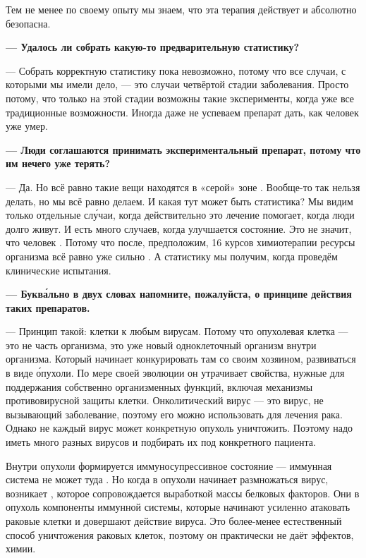 Тем не менее по своему опыту мы знаем, что эта терапия действует и абсолютно безопасна.

{\bf --- Удалось ли собрать какую-то предварительную статистику?}

--- Собрать корректную статистику пока невозможно, потому что все случаи, с которыми мы имели дело, --- это случаи четвёртой стадии заболевания. Просто потому, что только на этой стадии возможны такие эксперименты, когда уже  все традиционные возможности. Иногда даже не успеваем препарат дать, как человек уже умер.

{\bf --- Люди соглашаются принимать экспериментальный препарат, потому что им нечего уже терять?}

--- Да. Но всё равно такие вещи находятся в «серой» зоне . Вообще-то так нельзя делать, но мы всё равно делаем. И какая тут может быть статистика? Мы видим только отдельные сл\'{у}чаи, когда действительно это лечение помогает, когда люди долго живут. И есть много случаев, когда улучшается состояние. Это не значит, что человек . Потому что после, предположим, 16 курсов химиотерапии ресурсы организма всё равно уже сильно . А статистику мы получим, когда проведём клинические испытания.

{\bf --- Букв\'{а}льно в двух словах напомните, пожалуйста, о принципе действия таких препаратов.}

--- Принцип такой:  клетки  к любым вирусам. Потому что опухолевая клетка --- это не часть организма, это уже новый одноклеточный организм внутри организма. Который начинает конкурировать там со своим хозяином, развиваться в виде \'{о}пухоли. По мере своей эволюции он утрачивает свойства, нужные для поддержания собственно организменных функций, включая механизмы противовирусной защиты клетки. Онколитический вирус --- это вирус, не вызывающий заболевание, поэтому его можно использовать для лечения рака. Однако не каждый вирус может конкретную опухоль уничтожить. Поэтому надо иметь много разных вирусов и подбирать их под конкретного пациента.

Внутри опухоли формируется иммуносупрессивное состояние --- иммунная система не может туда . Но когда в опухоли начинает размножаться вирус, возникает , которое сопровождается выработкой массы белковых факторов. Они  в опухоль компоненты иммунной системы, которые начинают усиленно атаковать раковые клетки и довершают действие вируса. Это более-менее естественный способ уничтожения раковых клеток, поэтому он практически не даёт  эффектов,  химии.

